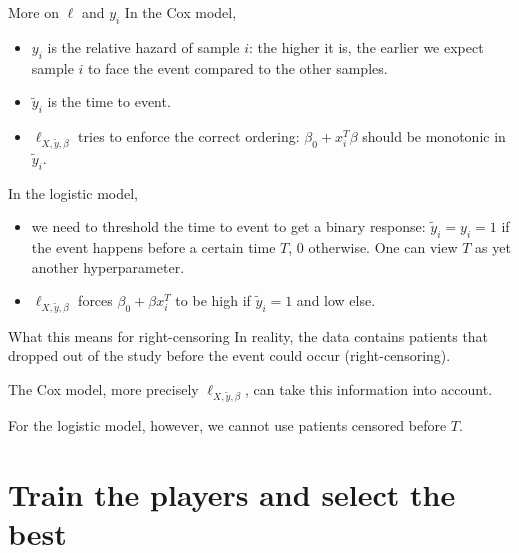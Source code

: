 \documentclass[10pt, aspectratio=169]{beamer}
\begin{document}
\begin{frame}{More on $\ell$ and $y_i$}
  In the \alert{Cox} model,
  \begin{itemize}
    \item $y_i$ is the \alert{relative hazard} of sample $i$: the higher it is, the earlier we 
      expect sample $i$ to face the event compared to the other samples.
    \item $\tilde{y}_i$ is the time to event.
    \item $\ell_{X, \tilde{y}, \beta}$ tries to enforce the correct ordering: $\beta_0 + x_i^T \beta$ 
      should be monotonic in $\tilde{y}_i$.
  \end{itemize}

  \pause
  In the \alert{logistic} model,
  \begin{itemize}
    \item we need to \alert{threshold the time to event} to get a \alert{binary response}: 
      $\tilde{y}_i = y_i = 1$ if the event happens before a certain time $T$, $0$ otherwise. 
      One can view \alert{$T$} as yet \alert{another hyperparameter}.
    \item $\ell_{X, \tilde{y}, \beta}$ forces $\beta_0 + \beta x_i^T$ to be high if 
      $\tilde{y}_i = 1$ and low else.
  \end{itemize}
\end{frame}

\begin{frame}{What this means for right-censoring}
  In reality, the data contains patients that dropped out of the study before the event could 
  occur (right-censoring).

  The Cox model, more precisely $\ell_{X, \tilde{y}, \beta}$, can take this information into 
  account.

  For the logistic model, however, we cannot use patients censored before $T$.
\end{frame}

\section{Train the players and select the best}
\end{document}

